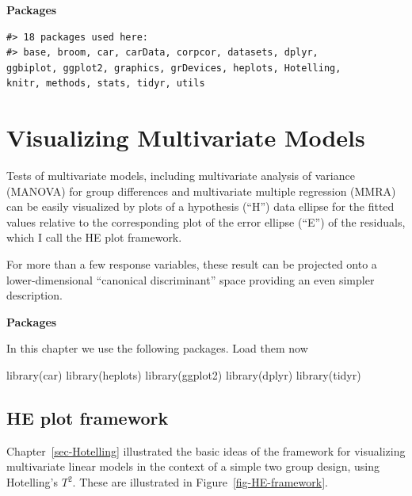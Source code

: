 \documentclass[
  letterpaper,
  10pt,
  krantz2]{krantz}
\makeatletter
\newenvironment{Shaded}{\begin{snugshade}}{\end{snugshade}}
\newcommand{\FunctionTok}[1]{\textcolor[rgb]{0.28,0.35,0.67}{#1}}
\newcommand{\NormalTok}[1]{\textcolor[rgb]{0.00,0.23,0.31}{#1}}
\newenvironment{kframe}{%
  \medskip{}
  \setlength{\fboxsep}{.8em}
  \def\at@end@of@kframe{}%
  \ifinner\ifhmode%
  \def\at@end@of@kframe{\end{minipage}}%
  \begin{minipage}{\columnwidth}%
  \fi\fi%
  \def\FrameCommand##1{\hskip\@totalleftmargin \hskip-\fboxsep
  \colorbox{shadecolor}{##1}\hskip-\fboxsep
      \hskip-\linewidth \hskip-\@totalleftmargin \hskip\columnwidth}%
  \MakeFramed {\advance\hsize-\width
    \@totalleftmargin\z@ \linewidth\hsize
    \@setminipage}}%
{\par\unskip\endMakeFramed%
  \at@end@of@kframe}
\renewenvironment{Shaded}{\begin{kframe}}{\end{kframe}}
\makeatother
\begin{document}
\textbf{Packages}

\begin{verbatim}
#> 18 packages used here:
#> base, broom, car, carData, corpcor, datasets, dplyr,
ggbiplot, ggplot2, graphics, grDevices, heplots, Hotelling,
knitr, methods, stats, tidyr, utils
\end{verbatim}


\hypertarget{sec-vis-mlm}{%
\chapter{Visualizing Multivariate Models}\label{sec-vis-mlm}}

Tests of multivariate models, including multivariate analysis of
variance (MANOVA) for group differences and multivariate multiple
regression (MMRA) can be easily visualized by plots of a hypothesis
(``H'') data ellipse for the fitted values relative to the corresponding
plot of the error ellipse (``E'') of the residuals, which I call the HE
plot framework.

For more than a few response variables, these result can be projected
onto a lower-dimensional ``canonical discriminant'' space providing an
even simpler description.

\textbf{Packages}

In this chapter we use the following packages. Load them now

\begin{Shaded}
\begin{Highlighting}[]
\FunctionTok{library}\NormalTok{(car)}
\FunctionTok{library}\NormalTok{(heplots)}
\FunctionTok{library}\NormalTok{(ggplot2)}
\FunctionTok{library}\NormalTok{(dplyr)}
\FunctionTok{library}\NormalTok{(tidyr)}
\end{Highlighting}
\end{Shaded}

\hypertarget{sec-he-framework}{%
\section{HE plot framework}\label{sec-he-framework}}

Chapter~\ref{sec-Hotelling} illustrated the basic ideas of the framework
for visualizing multivariate linear models in the context of a simple
two group design, using Hotelling's \(T^2\). These are illustrated in
Figure~\ref{fig-HE-framework}.
\end{document}
